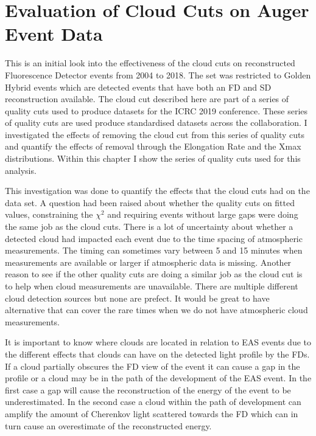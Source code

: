 \chapter[Evaluation of Cloud Cuts on Auger Event Data]{\centering Evaluation of Cloud Cuts on Auger Event Data \\}\label{Ch:CloudCuts}

This is an initial look into the effectiveness of the cloud cuts on reconstructed Fluorescence Detector events from 2004 to 2018. The set was restricted to Golden Hybrid events which are detected events that have both an FD and SD reconstruction available. The cloud cut described here are part of a series of quality cuts used to produce datasets for the ICRC 2019 conference. These series of quality cuts are used produce standardised datasets across the collaboration. I investigated the effects of removing the cloud cut from this series of quality cuts and quantify the effects of removal through the Elongation Rate and the Xmax distributions. Within this chapter I show the series of quality cuts used for this analysis.


This investigation was done to quantify the effects that the cloud cuts had on the data set. A question had been raised about whether the quality cuts on fitted values, constraining the  $\chi^2$ and requiring events without large gaps were doing the same job as the cloud cuts. There is a lot of uncertainty about whether a detected cloud had impacted each event due to the time spacing of atmospheric measurements. The timing can sometimes vary between 5 and 15 minutes when measurements are available or larger if  atmospheric data is missing. Another reason to see if the other quality cuts are doing a similar job as the cloud cut is to help when cloud measurements are unavailable. There are multiple different cloud detection sources but none are prefect. It would be great to have alternative that can cover the rare times when we do not have atmospheric cloud measurements.

It is important to know where clouds are located in relation to EAS events due to the different effects that clouds can have on the detected light profile by the FDs. If a cloud partially obscures the FD view of the event it can cause a gap in the profile or a cloud may be in the path of the development of the EAS event. In the first case a gap will cause the reconstruction of the energy of the event to be underestimated. In the second case a cloud within the path of development can amplify the amount of Cherenkov light scattered towards the FD which can in turn cause an overestimate of the reconstructed energy.

